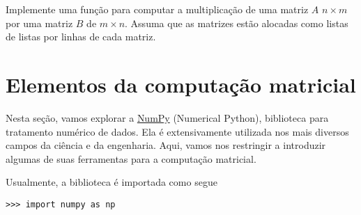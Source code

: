 \documentclass[12pt]{article}
\begin{document}
\begin{exr}
  Implemente uma função para computar a multiplicação de uma matriz $A$ $n\times m$ por uma matriz $B$ de $m\times n$. Assuma que as matrizes estão alocadas como listas de listas por linhas de cada matriz.
\end{exr}

\section{Elementos da computação matricial}\label{sec_mat}

Nesta seção, vamos explorar a \href{https://numpy.org/}{NumPy} (Numerical Python), biblioteca para tratamento numérico de dados. Ela é extensivamente utilizada nos mais diversos campos da ciência e da engenharia. Aqui, vamos nos restringir a introduzir algumas de suas ferramentas para a computação matricial.

Usualmente, a biblioteca é importada como segue
\begin{lstlisting}
>>> import numpy as np
\end{lstlisting}


\end{document}
